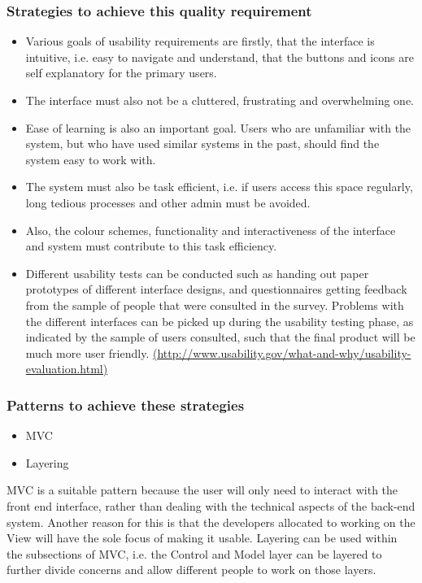 \documentclass[a4paper,12pt]{article}
\begin{document}
 \subsubsection{Strategies to achieve this quality requirement}
 \begin{itemize}
 \item Various goals of usability requirements are firstly, that the interface is intuitive, i.e. easy to navigate and understand, that the buttons and icons are self explanatory for the primary users.
 \item The interface must also not be a cluttered, frustrating and overwhelming one. 
 \item Ease of learning is also an important goal. Users who are unfamiliar with the system, but who have used similar systems in the past, should find the system easy to work with.
 \item The system must also be task efficient, i.e. if users access this space regularly, long tedious processes and other admin must be avoided.
\item Also, the colour schemes, functionality and interactiveness of the interface and system must contribute to this task efficiency. 
\item Different usability tests can be conducted such as handing out paper prototypes of different interface designs, and questionnaires getting feedback from the sample of people that were consulted in the survey. Problems with the different interfaces can be picked up during the usability testing phase, as indicated by the sample of users consulted, such that the final product will be much more user friendly. \url{(http://www.usability.gov/what-and-why/usability-evaluation.html)}

 \end{itemize}
 \subsubsection{Patterns to achieve these strategies}
 \begin{itemize}
 \item MVC
 \item Layering
\end{itemize}
MVC is a suitable pattern because the user will only need to interact with the front end interface, rather than dealing with the technical aspects of the back-end system. Another reason for this is that the developers allocated to working on the View will have the sole focus of making it usable.
Layering can be used within the subsections of MVC, i.e. the Control and Model layer can be layered to further divide concerns and allow different people to work on those layers.
\end{document}
